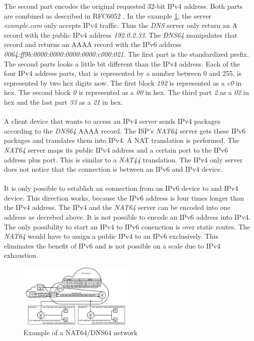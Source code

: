 \documentclass[format=sigconf, natbib=true, nonacm=true]{acmart}
\begin{document}
    The second part encodes the original requested 32-bit IPv4 address. Both parts are combined as described in RFC6052 \cite{rfc6052}. In the example \ref{fig:nat_64_dns_64}, the server \textit{example.com} only accepts IPv4 traffic. Thus the \textit{DNS} server only return an A record with the public IPv4 address \textit{192.0.2.33}. The \textit{DNS64} manipulates that record and returns an AAAA record with the IPv6 address \textit{0064:ff9b:0000:0000:0000:0000:c000:021}. The first part is the standardized prefix. The second parts looks a little bit different than the IPv4 address. Each of the four IPv4 address parts, that is represented by a number between 0 and 255, is represented by two hex digits now. The first block \textit{192} is represented as a \textit{c0} in hex. The second block \textit{0} is represented as a \textit{00} in hex. The third part \textit{2} as a \textit{02} in hex and the last part \textit{33} as a \textit{21} in hex\cite{rfc6052}.\\\\A client device that wants to access an IPv4 server sends IPv4 packages according to the \textit{DNS64} AAAA record. The ISP's \textit{NAT64} server gets these IPv6 packages and translates them into IPv4. A NAT translation is performed. The \textit{NAT64} server maps its public IPv4 address and a certain port to the IPv6 address plus port. This is similar to a \textit{NAT44} translation. The IPv4 only server does not notice that the connection is between an IPv6 and IPv4 device.\\\\It is only possible to establish an connection from an IPv6 device to and IPv4 device. This direction works, because the IPv6 address is four times longer than the IPv4 address. The IPv4 and the \textit{NAT64} server can be encoded into one address as decrebed above. It is not possible to encode an IPv6 address into IPv4. The only possibility to start an IPv4 to IPv6 conenction is over static routes. The \textit{NAT64} would have to assign a public IPv4 to an IPv6 exclusively. This eliminates the benefit of IPv6 and is not possible on a scale due to IPv4 exhaustion\cite{rfc6146}.
    \begin{figure}
        \centering
        \includegraphics[width=0.5\textwidth]{images/nat_64_dns_64.png}
        \caption{Example of a NAT64/DNS64 network}
        \label{fig:nat_64_dns_64}
    \end{figure}
\end{document}
